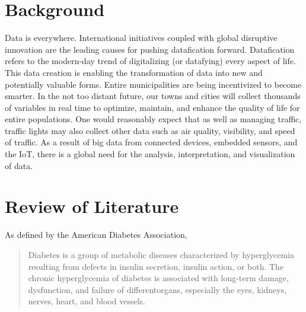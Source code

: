 \documentclass[12pt]{article}
\begin{document}
\newpage
\part{Background}
Data is everywhere. International initiatives coupled with global disruptive innovation are the leading causes for pushing datafication forward. Datafication refers to the modern-day trend of digitalizing (or datafying) every aspect of life. This data creation is enabling the transformation of data into new and potentially valuable forms. Entire municipalities are being incentivized to become smarter. In the not too distant future, our towns and cities will collect thousands of variables in real time to optimize, maintain, and enhance the quality of life for entire populations. One would reasonably expect that as well as managing traffic, traffic lights may also collect other data such as air quality, visibility, and speed of traffic. As a result of big data from connected devices, embedded sensors, and the IoT, there is a global need for the analysis, interpretation, and visualization of data.

\newpage
\part{Review of Literature}
\iffalse
Source : https://www.ncbi.nlm.nih.gov/pmc/articles/PMC5851210/
---------------------
Source : https://www.ncbi.nlm.nih.gov/pmc/articles/PMC6000484/
---------------------
PDF :
Andreas Holzinger 1,2( B )

Holzinger Group, HCI-KDD, Institute for Medical Informatics,
Statistics and Documentation, Medical University Graz, Graz, Austria
a.holzinger@hci-kdd.org

Institute for Information Systems and Computer Media,
Graz University of Technology, Graz, Austria
---------------------
\fi
As defined by the American Diabetes Association\cite{classdiag},
\begin{quote}
Diabetes is a group of metabolic diseases characterized by hyperglycemia resulting from defects in insulin secretion, insulin action, or both. The chronic hyperglycemia of diabetes is associated with long-term damage, dysfunction, and failure of differentorgans, especially the eyes, kidneys, nerves, heart, and blood vessels.
\end{quote}
\end{document}
